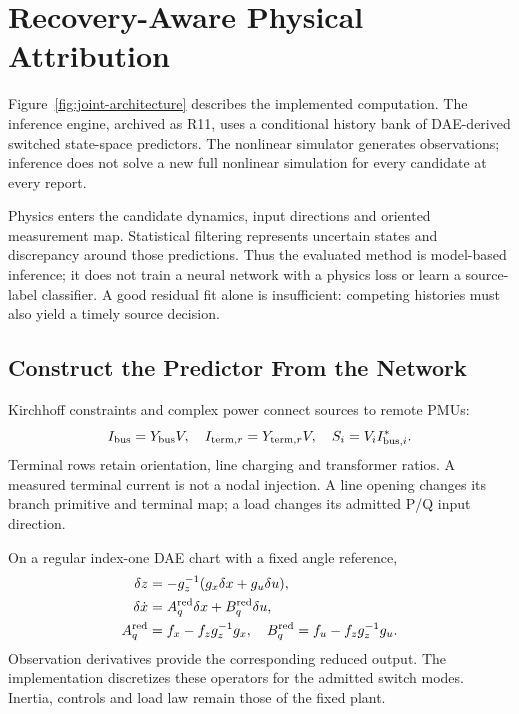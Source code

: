 \section{Recovery-Aware Physical Attribution}
\label{sec:narrative-method}

Figure~\ref{fig:joint-architecture} describes the implemented computation.
The inference engine, archived as R11, uses a conditional history bank of
DAE-derived switched state-space predictors. The nonlinear simulator
generates observations; inference does not solve a new full nonlinear
simulation for every candidate at every report.

Physics enters the candidate dynamics, input directions and oriented
measurement map. Statistical filtering represents uncertain states and
discrepancy around those predictions. Thus the evaluated method is
model-based inference; it does not train a neural network with a physics
loss or learn a source-label classifier. A good residual fit alone is
insufficient: competing histories must also yield a timely source decision.

\subsection{Construct the Predictor From the Network}

Kirchhoff constraints and complex power connect sources to remote PMUs:
\begin{equation}
 I_{\rm bus}=Y_{\rm bus}V,\quad
 I_{{\rm term},r}=Y_{{\rm term},r}V,\quad S_i=V_i I_{{\rm bus},i}^{*}.
 \label{eq:narrative-electrical}
\end{equation}
Terminal rows retain orientation, line charging and transformer ratios.
A measured terminal current is not a nodal injection. A line opening
changes its branch primitive and terminal map; a load changes its admitted
P/Q input direction.

On a regular index-one DAE chart with a fixed angle reference,
\begin{align}
 \delta z&=-g_z^{-1}(g_x\delta x+g_u\delta u),\nonumber\\
 \delta\dot x&=A_q^{\rm red}\delta x+B_q^{\rm red}\delta u,\nonumber\\
 A_q^{\rm red}&=f_x-f_zg_z^{-1}g_x,\quad
 B_q^{\rm red}=f_u-f_zg_z^{-1}g_u.
 \label{eq:narrative-reduction}
\end{align}
Observation derivatives provide the corresponding reduced output. The
implementation discretizes these operators for the admitted switch modes.
Inertia, controls and load law remain those of the fixed plant.

